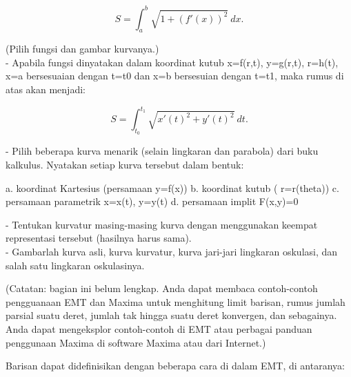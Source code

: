\documentclass[a4paper,10pt]{article}
\begin{document}
\begin{eulernotebook}
\begin{eulercomment}
\begin{eulercomment}
\begin{eulercomment}
\begin{eulercomment}
\begin{eulercomment}
\begin{eulercomment}
\begin{eulercomment}
\begin{eulercomment}
\begin{eulercomment}
\begin{eulercomment}
\begin{eulercomment}
\begin{eulercomment}
\begin{eulercomment}
\begin{eulercomment}
\begin{eulercomment}
\end{eulercomment}
\begin{eulerformula}
\[
S = \int_a^b \sqrt{1+(f'(x))^2} \ dx.
\]
\end{eulerformula}
\begin{eulercomment}
(Pilih fungsi dan gambar kurvanya.)\\
- Apabila fungsi dinyatakan dalam koordinat kutub x=f(r,t), y=g(r,t),
r=h(t), x=a bersesuaian dengan t=t0 dan x=b bersesuian dengan t=t1,
maka rumus di atas akan menjadi:

\end{eulercomment}
\begin{eulerformula}
\[
S=\int_{t_0}^{t_1} \sqrt{x'(t)^2+y'(t)^2}\ dt.
\]
\end{eulerformula}
\begin{eulercomment}
- Pilih beberapa kurva menarik (selain lingkaran dan parabola) dari
buku  kalkulus. Nyatakan setiap kurva tersebut dalam bentuk:\\
\end{eulercomment}
\begin{eulerttcomment}
  a. koordinat Kartesius (persamaan y=f(x))
  b. koordinat kutub ( r=r(theta))
  c. persamaan parametrik x=x(t), y=y(t)
  d. persamaan implit F(x,y)=0
\end{eulerttcomment}
\begin{eulercomment}
- Tentukan kurvatur masing-masing kurva dengan menggunakan keempat
representasi tersebut (hasilnya harus sama).\\
- Gambarlah kurva asli, kurva kurvatur, kurva jari-jari lingkaran
oskulasi, dan salah satu lingkaran oskulasinya.
\end{eulercomment}
\begin{eulercomment}
(Catatan: bagian ini belum lengkap. Anda dapat membaca contoh-contoh
pengguanaan EMT dan Maxima untuk menghitung limit barisan, rumus
jumlah parsial suatu deret, jumlah tak hingga suatu deret konvergen,
dan sebagainya. Anda dapat mengeksplor contoh-contoh di EMT atau
perbagai panduan penggunaan Maxima di software Maxima atau dari
Internet.)

Barisan dapat didefinisikan dengan beberapa cara di dalam EMT, di
antaranya:


\end{eulercomment}
\end{eulercomment}
\end{eulercomment}
\end{eulercomment}
\end{eulercomment}
\end{eulercomment}
\end{eulercomment}
\end{eulercomment}
\end{eulercomment}
\end{eulercomment}
\end{eulercomment}
\end{eulercomment}
\end{eulercomment}
\end{eulercomment}
\end{eulercomment}
\end{eulernotebook}
\end{document}
